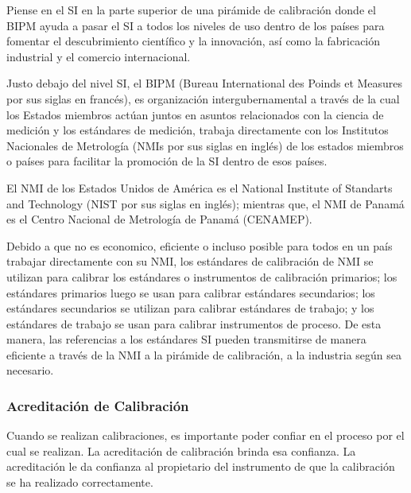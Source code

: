 		\par \noindent
			Piense en el SI en la parte superior de una pirámide de calibración donde el BIPM ayuda a pasar el SI a todos los niveles de uso dentro de los países para fomentar el descubrimiento científico y la innovación, así como la fabricación industrial y el comercio internacional.
			
\clearpage
\thispagestyle{plain}

		\par \noindent 
			Justo debajo del nivel SI, el BIPM (Bureau International des Poinds et Measures por sus siglas en francés), es organización intergubernamental a través de la cual los Estados miembros actúan juntos
			en asuntos relacionados con la ciencia de medición y los estándares de medición, trabaja directamente con los Institutos Nacionales de Metrología (NMIs por sus siglas en inglés) de los estados miembros o países para facilitar la promoción de la SI dentro de esos países.
			
		\par \noindent
			El NMI de los Estados Unidos de América es el National Institute of Standarts and Technology (NIST por sus siglas en inglés); mientras que, el NMI de Panamá es el Centro Nacional de Metrología de Panamá (CENAMEP).
			
		\par \noindent
			Debido a que no es economico, eficiente o incluso posible para todos en un país trabajar directamente con su NMI, los estándares de calibración de NMI se utilizan para calibrar los estándares o instrumentos de calibración primarios; los estándares primarios luego se usan para calibrar estándares secundarios; los estándares secundarios se utilizan para calibrar estándares de trabajo; y los estándares de trabajo se usan para calibrar instrumentos de proceso. De esta manera, las referencias a los estándares SI pueden transmitirse de manera eficiente a través de la NMI a la pirámide de calibración, a la industria según sea necesario.
			
	\subsubsection{Acreditación de Calibración}
		\par 
			Cuando se realizan calibraciones, es importante poder confiar en el proceso por el cual se realizan. La acreditación de calibración brinda esa confianza. La acreditación le da confianza al propietario del instrumento de que la calibración se ha realizado correctamente.
			
